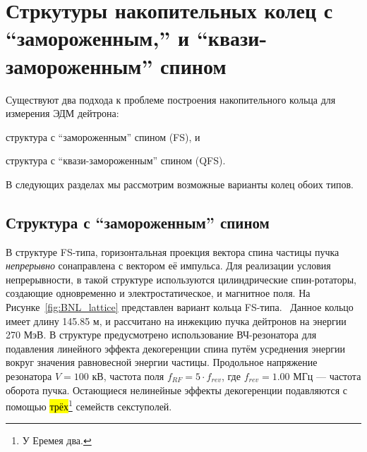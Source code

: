 \chapter{Стркутуры накопительных колец с ``замороженным,'' и ``квази-замороженным'' спином} \label{chpt:FS_and_QFS_lattices}

Существуют два подхода к проблеме построения накопительного кольца для измерения ЭДМ дейтрона: 
\begin{enumerate*}
	\item структура с ``замороженным'' спином (FS), и 
	\item структура с ``квази-замороженным'' спином (QFS).
\end{enumerate*}

В следующих разделах мы рассмотрим возможные варианты колец обоих типов.

\section{Структура с ``замороженным'' спином} \label{sec:FS_BNL_lattice}
В структуре FS-типа, горизонтальная проекция вектора спина частицы пучка \emph{непрерывно} сонаправлена с вектором её импульса. Для реализации условия непрерывности, в такой структуре используются цилиндрические спин-ротаторы, создающие одновременно и электростатическое, и магнитное поля. На Рисунке~\ref{fig:BNL_lattice} представлен вариант кольца FS-типа.~\cite{Senichev:Lattices} Данное кольцо имеет длину 145.85 м, и рассчитано на инжекцию пучка дейтронов на энергии 270 МэВ. В структуре предусмотрено использование ВЧ-резонатора для подавления линейного эффекта декогеренции спина путём усреднения энергии вокруг значения равновесной энергии частицы. Продольное напряжение резонатора $V = 100$ кВ, частота поля $f_{RF} = 5\cdot f_{rev}$, где $f_{rev} = 1.00$ МГц --- частота оборота пучка. Остающиеся нелинейные эффекты декогеренции подавляются с помощью \hl{трёх}\footnote{У Еремея два.} семейств секступолей.

